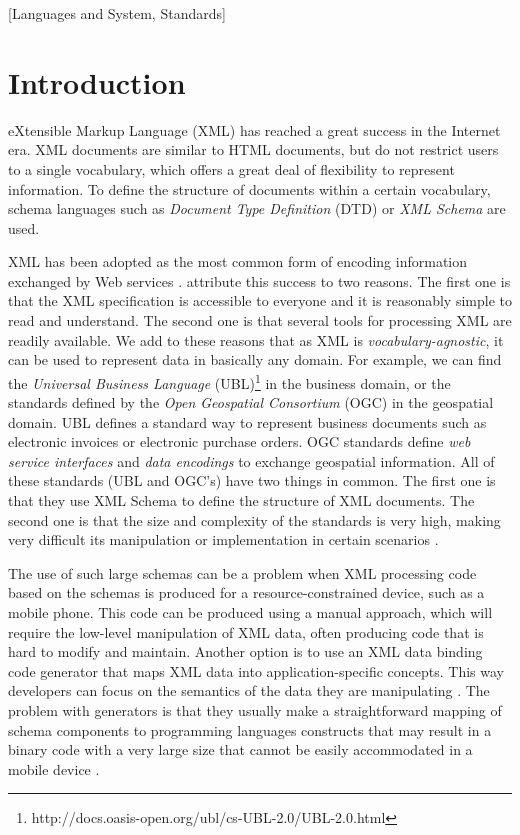 \documentclass{sig-alternate}
\begin{document}
[Languages and System, Standards]



\section{Introduction}

eXtensible Markup Language (XML) has reached a great success in the Internet era. 
XML documents are similar to HTML documents, but do not restrict users to a single vocabulary, which offers a great deal of flexibility to represent information. 
To define the structure of documents within a certain vocabulary, schema languages such as \textit{Document Type Definition} (DTD) or \textit{XML Schema} are used. 

XML has been adopted as the most common form of encoding information exchanged by Web services  \cite{proc:kay, article:wilde2, article:wilde}. 
\cite{proc:kay} attribute this success to two reasons. 
The first one is that the XML specification is accessible to everyone and it is reasonably simple to read and understand. 
The second one is that several tools for processing XML are readily available. 
We add to these reasons that as XML is \textit{vocabulary-agnostic}, it can be used to represent data in basically any domain. 
For example, we can find the \textit{Universal Business Language} (UBL)\footnote{http://docs.oasis-open.org/ubl/cs-UBL-2.0/UBL-2.0.html} in the business domain, or the standards defined by the \textit{Open Geospatial Consortium} (OGC) in the geospatial domain. 
UBL defines a standard way to represent business documents such as electronic invoices or  electronic purchase orders. OGC standards define \textit{web service interfaces} and \textit{data encodings} to exchange geospatial information. 
All of these standards (UBL and OGC's) have two things in common. 
The first one is that they use XML Schema to define the structure of XML documents. 
The second one is that the size and complexity of the standards is very high, making very difficult its manipulation or implementation in certain scenarios \cite{proc:pichler, proc:tamayo3}.  

The use of such large schemas can be a problem when XML processing code based on the schemas is produced for a resource-constrained device, such as a mobile phone. 
This code can be produced using a manual approach, which will require the low-level manipulation of XML data, often producing code that is hard to modify and maintain. 
Another option is to use an XML data binding code generator that maps XML data into application-specific concepts. 
This way developers can focus on the semantics of the data they are manipulating \cite{proc:white}. 
The problem with generators is that they usually make a straightforward mapping of schema components to programming languages constructs that may result in a binary code with a very large size that cannot be easily accommodated in a mobile device \cite{proc:tamayo3}.  
\end{document}
